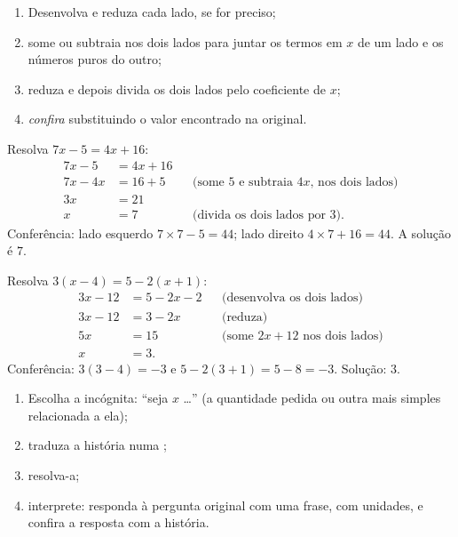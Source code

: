 \begin{method}\label{met:g8:equations:solve}
\begin{enumerate}
  \item Desenvolva e reduza cada lado, se for preciso;
  \item some ou subtraia nos dois lados para juntar os termos em $x$ de
        um lado e os números puros do outro;
  \item reduza e depois divida os dois lados pelo coeficiente de $x$;
  \item \emph{confira} substituindo o valor encontrado na 
        original.
\end{enumerate}
\end{method}

\begin{example}\label{ex:g8:equations:solve}
Resolva $7x - 5 = 4x + 16$:
\begin{align*}
7x - 5 &= 4x + 16 \\
7x - 4x &= 16 + 5
&& \text{(some $5$ e subtraia $4x$, nos dois lados)} \\
3x &= 21 \\
x &= 7 && \text{(divida os dois lados por 3).}
\end{align*}
Conferência: lado esquerdo $7 \times 7 - 5 = 44$; lado direito
$4 \times 7 + 16 = 44$. A solução é $7$.
\end{example}

\begin{example}\label{ex:g8:equations:brackets}
Resolva $3(x - 4) = 5 - 2(x + 1)$:
\begin{align*}
3x - 12 &= 5 - 2x - 2 && \text{(desenvolva os dois lados)} \\
3x - 12 &= 3 - 2x && \text{(reduza)} \\
5x &= 15 && \text{(some $2x + 12$ nos dois lados)} \\
x &= 3 .
\end{align*}
Conferência: $3(3 - 4) = -3$ e $5 - 2(3+1) = 5 - 8 = -3$. \quad
Solução: $3$.
\end{example}

\begin{method}\label{met:g8:equations:problem}
\begin{enumerate}
  \item Escolha a incógnita: ``seja $x$ \dots'' (a quantidade pedida ou
        outra mais simples relacionada a ela);
  \item traduza a história numa ;
  \item resolva-a;
  \item interprete: responda à pergunta original com uma frase, com
        unidades, e confira a resposta com a história.
\end{enumerate}
\end{method}

